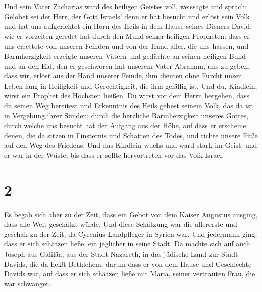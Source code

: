  Und sein Vater Zacharias ward des heiligen Geistes voll,
weissagte und sprach:  Gelobet sei der Herr, der Gott
Israels! denn er hat besucht und erlöst sein Volk  und
hat uns aufgerichtet ein Horn des Heils in dem Hause seines Dieners
David,  wie er vorzeiten geredet hat durch den Mund
seiner heiligen Propheten:  dass er uns errettete von
unseren Feinden und von der Hand aller, die uns hassen, 
und Barmherzigkeit erzeigte unseren Vätern und gedächte an seinen
heiligen Bund  und an den Eid, den er geschworen hat
unserem Vater Abraham, uns zu geben,  dass wir, erlöst
aus der Hand unserer Feinde, ihm dienten ohne Furcht unser Leben lang
 in Heiligkeit und Gerechtigkeit, die ihm gefällig ist.
 Und du, Kindlein, wirst ein Prophet des Höchsten heißen.
Du wirst vor dem Herrn hergehen, dass du seinen Weg bereitest
 und Erkenntnis des Heils gebest seinem Volk, das da ist
in Vergebung ihrer Sünden;  durch die herzliche
Barmherzigkeit unseres Gottes, durch welche uns besucht hat der Aufgang
aus der Höhe,  auf dass er erscheine denen, die da sitzen
in Finsternis und Schatten des Todes, und richte unsere Füße auf den Weg
des Friedens.  Und das Kindlein wuchs und ward stark im
Geist; und er war in der Wüste, bis dass er sollte hervortreten vor das
Volk Israel.

\hypertarget{section-1}{%
\section{2}\label{section-1}}

 Es begab sich aber zu der Zeit, dass ein Gebot von dem
Kaiser Augustus ausging, dass alle Welt geschätzt würde. 
Und diese Schätzung war die allererste und geschah zu der Zeit, da
Cyrenius Landpfleger in Syrien war.  Und jedermann ging,
dass er sich schätzen ließe, ein jeglicher in seine Stadt.
 Da machte sich auf auch Joseph aus Galiläa, aus der Stadt
Nazareth, in das jüdische Land zur Stadt Davids, die da heißt Bethlehem,
darum dass er von dem Hause und Geschlechte Davids war, 
auf dass er sich schätzen ließe mit Maria, seiner vertrauten Frau, die
war schwanger.

